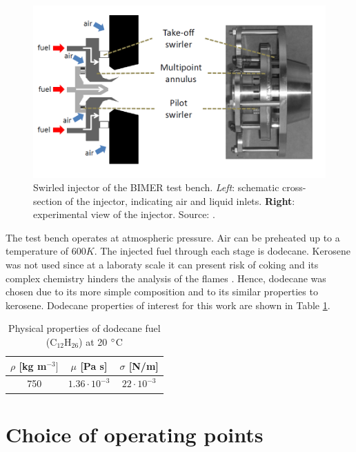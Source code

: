\begin{figure}[h!]
	\centering
	\includegraphics[scale=0.6]{./part3_applications/figures_ch7_aero/BIMER_swirler}
	\caption{Swirled injector of the BIMER test bench. \textsl{Left}: schematic cross-section of the injector, indicating air and liquid inlets. \textbf{Right}: experimental view of the injector. Source: .}
	\label{fig:BIMER_swirler}
\end{figure}

The test bench operates at atmospheric pressure. Air can be preheated up to a temperature of $600 K$. The injected fuel through each stage is dodecane. Kerosene was not used since at a laboraty scale it can present risk of coking and its complex chemistry hinders the analysis of the flames . Hence, dodecane was chosen due to its more simple composition and to its similar properties to kerosene. Dodecane properties of interest for this work are shown in Table \ref{tab:dodecane_properties}.

\begin{table}[!h]
\centering
\caption{Physical properties of dodecane fuel (C$_{12}$H$_26$) at 20 $\degree$C}
\begin{tabular}{|c|c|c|}
\hline
$\rho$ [kg m$^{-3}]$   & $\mu$ [Pa s]   & $\sigma$ [N/m]  \\
\hline
750 & $1.36 \cdot 10^{-3}$ & $22 \cdot 10^{-3}$ \\
\hline
\end{tabular}
\label{tab:dodecane_properties}
\end{table}


\section{Choice of operating points}



